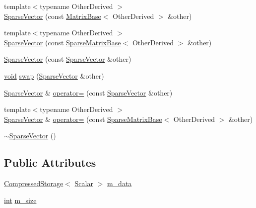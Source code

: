 \begin{DoxyCompactItemize}
{\footnotesize template$<$typename Other\-Derived $>$ }\\\hyperlink{class_sparse_vector_ad7bbf1b70af899fbf086f41d62c3189e}{Sparse\-Vector} (const \hyperlink{class_matrix_base}{Matrix\-Base}$<$ Other\-Derived $>$ \&other)
\item 
{\footnotesize template$<$typename Other\-Derived $>$ }\\\hyperlink{class_sparse_vector_a929576b5069d28c667a373c8d1fae573}{Sparse\-Vector} (const \hyperlink{class_sparse_matrix_base}{Sparse\-Matrix\-Base}$<$ Other\-Derived $>$ \&other)
\item 
\hyperlink{class_sparse_vector_a08781e266ec6c0b98f228905d04a01ee}{Sparse\-Vector} (const \hyperlink{class_sparse_vector}{Sparse\-Vector} \&other)
\item 
\hyperlink{group___u_a_v_objects_plugin_ga444cf2ff3f0ecbe028adce838d373f5c}{void} \hyperlink{class_sparse_vector_ad57bb16e85e2b3f957d1a0cd7e41239a}{swap} (\hyperlink{class_sparse_vector}{Sparse\-Vector} \&other)
\item 
\hyperlink{class_sparse_vector}{Sparse\-Vector} \& \hyperlink{class_sparse_vector_a0a249860458dc22a8b65b286403ddfd8}{operator=} (const \hyperlink{class_sparse_vector}{Sparse\-Vector} \&other)
\item 
{\footnotesize template$<$typename Other\-Derived $>$ }\\\hyperlink{class_sparse_vector}{Sparse\-Vector} \& \hyperlink{class_sparse_vector_abd10576024286daa6db322f770f66d39}{operator=} (const \hyperlink{class_sparse_matrix_base}{Sparse\-Matrix\-Base}$<$ Other\-Derived $>$ \&other)
\item 
\hyperlink{class_sparse_vector_a60247738fea1b560c791de2cf8248c54}{$\sim$\-Sparse\-Vector} ()
\end{DoxyCompactItemize}
\subsection*{Public Attributes}
\begin{DoxyCompactItemize}
\item 
\hyperlink{class_compressed_storage}{Compressed\-Storage}$<$ \hyperlink{class_sparse_matrix_base_af39d70f2b7e775e9e17b666cd24128c8}{Scalar} $>$ \hyperlink{class_sparse_vector_ad111f906cd22fea7a5e8fe3c19d855bf}{m\-\_\-data}
\item 
\hyperlink{ioapi_8h_a787fa3cf048117ba7123753c1e74fcd6}{int} \hyperlink{class_sparse_vector_a57bf4f94a89a405f06238fb994d5fece}{m\-\_\-size}
\end{DoxyCompactItemize}
